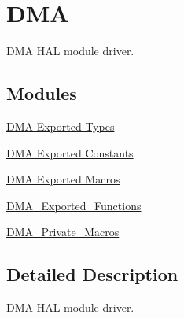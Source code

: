 \hypertarget{group___d_m_a}{}\section{D\+MA}
\label{group___d_m_a}


D\+MA H\+AL module driver.  


\subsection*{Modules}
\begin{DoxyCompactItemize}
\item 
\hyperlink{group___d_m_a___exported___types}{D\+M\+A Exported Types}
\item 
\hyperlink{group___d_m_a___exported___constants}{D\+M\+A Exported Constants}
\item 
\hyperlink{group___d_m_a___exported___macros}{D\+M\+A Exported Macros}
\item 
\hyperlink{group___d_m_a___exported___functions}{D\+M\+A\+\_\+\+Exported\+\_\+\+Functions}
\item 
\hyperlink{group___d_m_a___private___macros}{D\+M\+A\+\_\+\+Private\+\_\+\+Macros}
\end{DoxyCompactItemize}


\subsection{Detailed Description}
D\+MA H\+AL module driver. 

